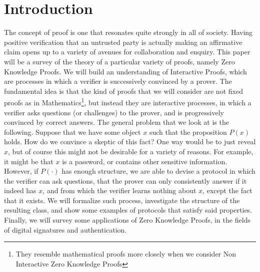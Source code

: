 \documentclass{article}
\begin{document}
\section{Introduction}
The concept of proof is one that resonates quite strongly in all of society. Having positive verification that
an untrusted party is actually making an affirmative claim opens up to a variety of avenues for collaboration and
enquiry. This paper will be a survey of the theory of a particular variety of proofs, namely Zero Knowledge Proofs.
We will build an understanding of Interactive Proofs, which are processes in which a verifier is successively convinced
by a prover. The fundamental idea is that the kind of proofs that we will consider are not fixed proofs as in Mathematics\footnote{They resemble mathematical proofs more closely when we consider Non Interactive Zero Knowledge Proofs},
but instead they are interactive processes, in which a verifier asks questions (or challenges) to the prover, and is progressively
convinced by correct answers.
The general problem that we look at is the following. Suppose that we have some object $x$ such that the proposition
$P(x)$ holds. How do we convince a skeptic of this fact? One way would be to just reveal $x$, but of course this
might not be desirable for a variety of reasons. For example, it might be that $x$ is a password, or contains other sensitive
information.  However, if $P(\cdot)$ has enough structure, we are able to devise a protocol in which the verifier can ask questions,
that the prover can only consistently answer if it indeed has $x$, and from which the verifier learns nothing about $x$,
except the fact that it exists. We will formalize such process, investigate the structure of the resulting class, and show some examples of protocols that satisfy said properties.
Finally, we will survey some applications of Zero Knowledge Proofs, in the fields of digital signatures and authentication.
\end{document}
